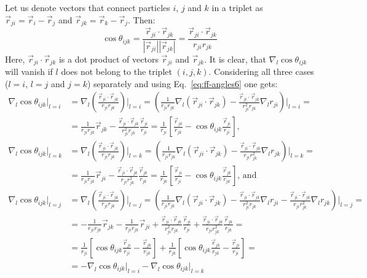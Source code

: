 \documentclass[11pt]{book}
\begin{document}
Let us denote vectors that connect particles $i$, $j$ and $k$ in a triplet as $\vec{r}_{ji}=\vec{r}_{i}-\vec{r}_{j}$ and $\vec{r}_{jk}=\vec{r}_{k}-\vec{r}_{j}$. Then:
\begin{equation}\label{eq:ff-angles6}
\cos\theta_{ijk}=\frac{\vec{r}_{ji}\cdot\vec{r}_{jk}}{|\vec{r}_{ji}||\vec{r}_{jk}|}=\frac{\vec{r}_{ji}\cdot\vec{r}_{jk}}{r_{ji}r_{jk}}
\end{equation}
Here, $\vec{r}_{ji}\cdot\vec{r}_{jk}$ is a dot product of vectors $\vec{r}_{ji}$ and $\vec{r}_{jk}$. It is clear, that $\nabla_{l}\cos\theta_{ijk}$ will vanish if $l$ does not belong to the triplet $(i,j,k)$. Considering all three cases ($l=i$, $l=j$ and $j=k$) separately and using Eq.~\ref{eq:ff-angles6} one gets:
\begin{equation}\label{eq:ff-angles7}
\begin{split}
\nabla_{l}\cos\theta_{ijk}\bigg|_{l=i}&=\nabla_{l}\left(\frac{\vec{r}_{ji}\cdot\vec{r}_{jk}}{r_{ji}r_{jk}}\right)\bigg|_{l=i}=\left(\frac{1}{r_{ji}r_{jk}}\nabla_{l}\left(\vec{r}_{ji}\cdot\vec{r}_{jk}\right)-\frac{\vec{r}_{ji}\cdot\vec{r}_{jk}}{r_{ji}^{2}r_{jk}}\nabla_{l}r_{ji}\right)\bigg|_{l=i}=\\
&=\frac{1}{r_{ji}r_{jk}}\vec{r}_{jk}-\frac{\vec{r}_{ji}\cdot\vec{r}_{jk}}{r_{ji}^{2}r_{jk}}\frac{\vec{r}_{ji}}{r_{ji}}=\frac{1}{r_{ji}}\left[\frac{\vec{r}_{jk}}{r_{jk}}-\cos\theta_{ijk}\frac{\vec{r}_{ji}}{r_{ji}}\right]\text{,}\\
\nabla_{l}\cos\theta_{ijk}\bigg|_{l=k}&=\nabla_{l}\left(\frac{\vec{r}_{ji}\cdot\vec{r}_{jk}}{r_{ji}r_{jk}}\right)\bigg|_{l=k}=\left(\frac{1}{r_{ji}r_{jk}}\nabla_{l}\left(\vec{r}_{ji}\cdot\vec{r}_{jk}\right)-\frac{\vec{r}_{ji}\cdot\vec{r}_{jk}}{r_{ji}r_{jk}^{2}}\nabla_{l}r_{jk}\right)\bigg|_{l=k}=\\
&=\frac{1}{r_{ji}r_{jk}}\vec{r}_{ji}-\frac{\vec{r}_{ji}\cdot\vec{r}_{jk}}{r_{ji}r_{jk}^{2}}\frac{\vec{r}_{jk}}{r_{jk}}=\frac{1}{r_{jk}}\left[\frac{\vec{r}_{ji}}{r_{ji}}-\cos\theta_{ijk}\frac{\vec{r}_{jk}}{r_{jk}}\right]\text{, and}\\
\nabla_{l}\cos\theta_{ijk}\bigg|_{l=j}&=\nabla_{l}\left(\frac{\vec{r}_{ji}\cdot\vec{r}_{jk}}{r_{ji}r_{jk}}\right)\bigg|_{l=j}=\left(\frac{1}{r_{ji}r_{jk}}\nabla_{l}\left(\vec{r}_{ji}\cdot\vec{r}_{jk}\right)-\frac{\vec{r}_{ji}\cdot\vec{r}_{jk}}{r_{ji}^{2}r_{jk}}\nabla_{l}r_{ji}-\frac{\vec{r}_{ji}\cdot\vec{r}_{jk}}{r_{ji}r_{jk}^{2}}\nabla_{l}r_{jk}\right)\bigg|_{l=j}=\\
&=-\frac{1}{r_{ji}r_{jk}}\vec{r}_{jk}-\frac{1}{r_{ji}r_{jk}}\vec{r}_{ji}+\frac{\vec{r}_{ji}\cdot\vec{r}_{jk}}{r_{ji}^{2}r_{jk}}\frac{\vec{r}_{ji}}{r_{ji}}+\frac{\vec{r}_{ji}\cdot\vec{r}_{jk}}{r_{ji}r_{jk}^{2}}\frac{\vec{r}_{jk}}{r_{jk}}=\\
&=\frac{1}{r_{ji}}\left[\cos\theta_{ijk}\frac{\vec{r}_{ji}}{r_{ji}}-\frac{\vec{r}_{jk}}{r_{jk}}\right] + \frac{1}{r_{jk}}\left[\cos\theta_{ijk}\frac{\vec{r}_{jk}}{r_{jk}}-\frac{\vec{r}_{ji}}{r_{ji}}\right]=\\
&=-\nabla_{l}\cos\theta_{ijk}\bigg|_{l=i}-\nabla_{l}\cos\theta_{ijk}\bigg|_{l=k}
\end{split}
\end{equation}
\end{document}
